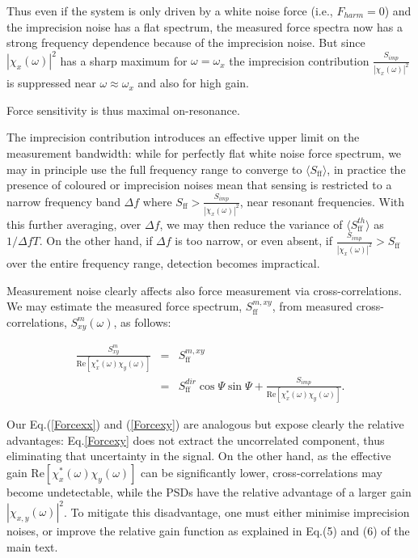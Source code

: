 \documentclass[twocolumn,english,notitlepage,superscriptaddress,nofootinbib]{revtex4-2}
\begin{document}
Thus even if the system is only driven by a white noise force (i.e., $F_{harm}=0$) and the imprecision noise has a flat spectrum, the measured force spectra now has a strong frequency dependence because of the imprecision noise. But since $|\chi_x(\omega)|^2$ has a sharp maximum for $\omega=\omega_x$ the imprecision contribution $\frac{S_{imp}} {|\chi_x(\omega)|^2}$ is suppressed near $\omega \approx \omega_x$ and also for high gain.

Force sensitivity is thus maximal on-resonance.

The imprecision contribution introduces an effective upper limit on the measurement bandwidth: while for perfectly flat white noise   force spectrum,  we may in principle use the full frequency range to converge to $\langle S_{\text{ff}} \rangle$, in practice the presence of coloured or imprecision noises mean that sensing is restricted to a narrow frequency band $\Delta f$  where $S_{\text{ff}} >\frac{S_{imp}} {|\chi_x(\omega)|^2}$, near resonant frequencies. With this further averaging, over $\Delta f$,  we  may then reduce the variance of $\langle S^{th}_{\text{ff}}\rangle$ as  $1/\Delta f T$.   On the other hand, if $\Delta f$ is too narrow, or even absent,  if $\frac{S_{imp}} {|\chi_x(\omega)|^2} > S_{\text{ff}}$ over the entire frequency range, detection becomes impractical.

Measurement noise clearly affects also force measurement via cross-correlations.  We may  estimate the measured force spectrum,  $S^{m,xy}_{\text{ff}}$, from  measured  cross-correlations,  $S^{m}_{xy}(\omega)$,  as follows:

\begin{eqnarray}
   \frac{S^{m}_{xy}}  {\text{Re}[\chi^*_x(\omega)\chi_y(\omega)]} & = & S^{m,xy}_{\text{ff}}  \\
   &  =  & S^{dir}_{\text{ff}}\cos \Psi \sin \Psi + \frac{S_{imp}}  {\text{Re}[\chi^*_x(\omega)\chi_y(\omega)]}.\nonumber 
 \label{Forcexy}
\end{eqnarray}

Our Eq.(\ref{Forcexx}) and (\ref{Forcexy}) are analogous but expose clearly the relative advantages: Eq.\ref{Forcexy} does not extract the uncorrelated component, thus eliminating that uncertainty in the signal.
On the other hand,  as the effective gain $\text{Re}[\chi^*_x(\omega)\chi_y(\omega)]$ can be significantly lower,  cross-correlations may become undetectable, while the PSDs have the relative advantage of a larger gain $|\chi_{x,y}(\omega)|^2$.  To mitigate this disadvantage,  one must either minimise imprecision noises,  or improve the relative gain function as explained in Eq.(5) and (6) of the main text.
\end{document}
